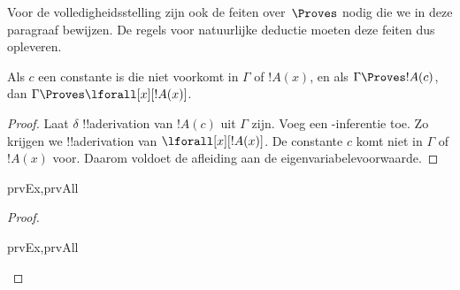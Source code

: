 \documentclass[../../../include/open-logic-section]{subfiles}
\begin{document}


\begin{explain}
  Voor de volledigheidsstelling zijn ook de feiten over~$\Proves$
  nodig die we in deze paragraaf bewijzen. De regels voor natuurlijke
  deductie moeten deze feiten dus opleveren.
\end{explain}

\begin{thm}
 Als $c$ een constante is die niet
voorkomt in $\Gamma$ of $!A(x)$, en als $\Gamma \Proves !A(c)$, dan
$\Gamma
\Proves \lforall[x][!A(x)]$.
\end{thm}

\begin{proof}
Laat $\delta$ !!a{derivation} van $!A(c)$ uit $\Gamma$ zijn. Voeg een
\Intro{\lforall}-inferentie toe. Zo krijgen we !!a{derivation} van
$\lforall[x][!A(x)]$. De constante $c$ komt niet in $\Gamma$ of
$!A(x)$ voor. Daarom voldoet de afleiding aan de
eigenvariabelevoorwaarde.
\end{proof}

\begin{prop}
\begin{tagenumerate}{prvEx,prvAll}

\end{tagenumerate}
\end{prop}

\begin{proof}
\begin{tagenumerate}{prvEx,prvAll}

\end{tagenumerate}
\end{proof}
\end{document}
